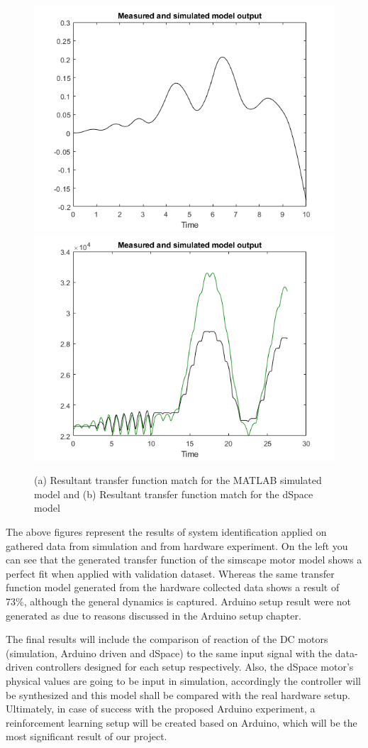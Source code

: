 \documentclass[]{final_report}
\begin{document}
\begin{figure} [h!]
\centerline{\includegraphics[width=.55\textwidth]{Screenshots for paper/matlab models/simulation_transfer_function_sys_ident.png}
{\includegraphics[width=.55\textwidth]{Screenshots for paper/dSpace/hardware_test_sys_ident.png}}
}
\caption{(a) Resultant transfer function match for the MATLAB simulated model and (b) Resultant transfer function match for the dSpace model }
\label{fig:tfresultsim2}
\end{figure}


The above figures represent the results of system identification applied on gathered data from simulation and from hardware experiment. On the left you can see that the generated transfer function of the simscape motor model shows a perfect fit when applied with validation dataset. Whereas the same transfer function model generated from the hardware collected data shows a result of 73\%, although the general dynamics is captured. Arduino setup result were not generated as due to reasons discussed in the Arduino setup chapter. 

The final results will include the comparison of reaction of the DC motors (simulation, Arduino driven and dSpace) to the same input signal with the data-driven controllers designed for each setup respectively. Also, the dSpace motor's physical values are going to be input in simulation, accordingly the controller will be synthesized and this model shall be compared with the real hardware setup. Ultimately, in case of success with the proposed Arduino experiment, a reinforcement learning setup will be created based on Arduino, which will be the most significant result of our project.
\end{document}
